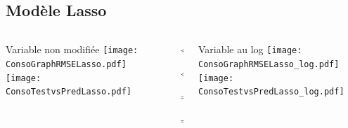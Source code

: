 \documentclass[8pt,aspectratio=169,hyperref={unicode=true}]{beamer}
\begin{document}
\subsection{Modèle Lasso}
\begin{frame}{\insertsubsection}
  \begin{columns}[t]
    \begin{column}{.31\textwidth}
      \centering Variable non modifiée
      \texttt{[image: ConsoGraphRMSELasso.pdf]}
      \texttt{[image: ConsoTestvsPredLasso.pdf]}
    \end{column}
    \begin{column}{.38\textwidth}
      $\Longleftarrow$
      \scriptsize
      {\centering
        }
      

      \normalsize
      $\Longleftarrow$

      \raggedleft $\Longrightarrow$
      \scriptsize
      {\centering
        }
      

      \normalsize
      $\Longrightarrow$
    \end{column}
    \begin{column}{.31\textwidth}
      \centering Variable au log
      \texttt{[image: ConsoGraphRMSELasso\_log.pdf]}
      \texttt{[image: ConsoTestvsPredLasso\_log.pdf]}
    \end{column}
  \end{columns}
\end{frame}
\end{document}
